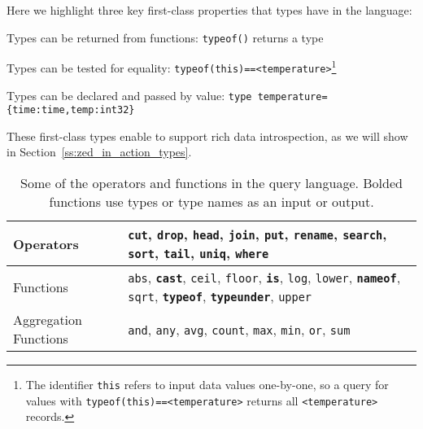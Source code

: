 
 Here we highlight three key first-class properties that types have in the \sys{} language:
\begin{CompactItemize}
    \item Types can be returned from functions: \texttt{typeof()} returns a type
    \item Types can be tested for equality: \texttt{typeof(this)==<temperature>}\footnote{The identifier \texttt{this} refers to input data values one-by-one, so a query for values with \texttt{typeof(this)==<temperature>} returns all \texttt{<temperature>} records.}
    \item Types can be declared and passed by value: \newline{} \texttt{type temperature=\{time:time,temp:int32\}}
\end{CompactItemize}
These first-class types enable \sys{} to support rich data introspection, as we will show in Section~\ref{ss:zed_in_action_types}.

\begin{table}[t]
\begin{center}
\small
 \begin{tabularx}{\columnwidth}{|p{2.6cm}|X|}
\hline
Operators & \texttt{cut}, \texttt{drop}, \texttt{head}, \texttt{join}, \texttt{put}, \texttt{rename}, \texttt{search}, \texttt{sort}, \texttt{tail}, \texttt{uniq}, \texttt{where} \\
\hline
Functions & \texttt{abs}, {\bf\texttt{cast}}, \texttt{ceil}, \texttt{floor}, {\bf \texttt{is}}, \texttt{log}, \texttt{lower}, {\bf \texttt{nameof}}, \texttt{sqrt}, {\bf \texttt{typeof}}, {\bf \texttt{typeunder}}, \texttt{upper}\\
\hline
Aggregation Functions & \texttt{and}, \texttt{any}, \texttt{avg}, \texttt{count}, \texttt{max}, \texttt{min}, \texttt{or}, \texttt{sum} \\
\hline
 \end{tabularx}
\end{center}
\caption{Some of the operators and functions in the \sys{} query language. Bolded functions use types or type names as an input or output.}
\label{t:query_language}
\vspace{-1em}
\end{table}

